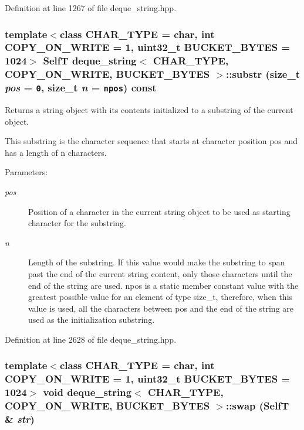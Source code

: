 Definition at line 1267 of file deque\_\-string.hpp.\hypertarget{classdeque__string_83a5b6ab306f888837fd3917acf59f0b}{
\subsubsection[{substr}]{\setlength{\rightskip}{0pt plus 5cm}template$<$class CHAR\_\-TYPE  = char, int COPY\_\-ON\_\-WRITE = 1, uint32\_\-t BUCKET\_\-BYTES = 1024$>$ {\bf SelfT} {\bf deque\_\-string}$<$ CHAR\_\-TYPE, COPY\_\-ON\_\-WRITE, BUCKET\_\-BYTES $>$::substr (size\_\-t {\em pos} = {\tt 0}, \/  size\_\-t {\em n} = {\tt {\bf npos}}) const}}
\label{classdeque__string_83a5b6ab306f888837fd3917acf59f0b}


Returns a string object with its contents initialized to a substring of the current object.

This substring is the character sequence that starts at character position pos and has a length of n characters.

\begin{Desc}
\item[Parameters:]
\begin{description}
\item[{\em pos}]Position of a character in the current string object to be used as starting character for the substring. \item[{\em n}]Length of the substring. If this value would make the substring to span past the end of the current string content, only those characters until the end of the string are used. npos is a static member constant value with the greatest possible value for an element of type size\_\-t, therefore, when this value is used, all the characters between pos and the end of the string are used as the initialization substring. \end{description}
\end{Desc}


Definition at line 2628 of file deque\_\-string.hpp.\hypertarget{classdeque__string_a1c4ef097e5967b11e1b06b13fb4a9bb}{
\subsubsection[{swap}]{\setlength{\rightskip}{0pt plus 5cm}template$<$class CHAR\_\-TYPE  = char, int COPY\_\-ON\_\-WRITE = 1, uint32\_\-t BUCKET\_\-BYTES = 1024$>$ void {\bf deque\_\-string}$<$ CHAR\_\-TYPE, COPY\_\-ON\_\-WRITE, BUCKET\_\-BYTES $>$::swap ({\bf SelfT} \& {\em str})}}
\label{classdeque__string_a1c4ef097e5967b11e1b06b13fb4a9bb}



